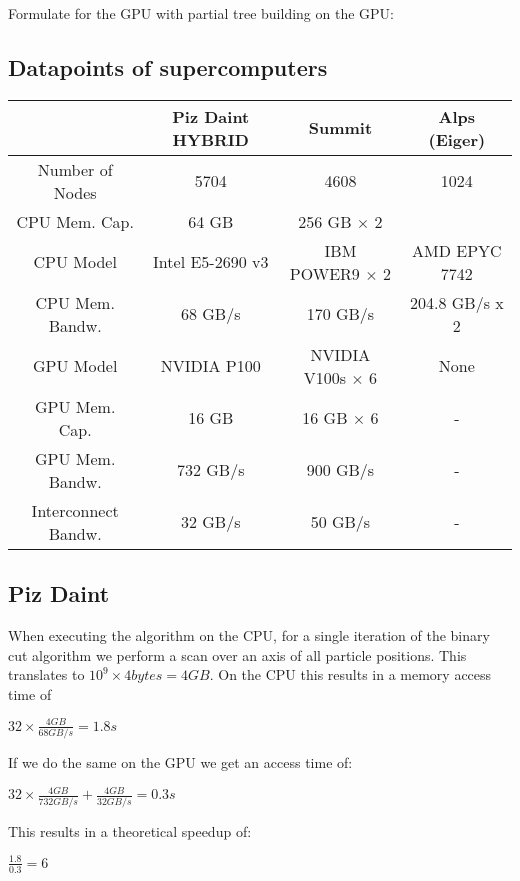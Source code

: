 \documentclass[]{article}
\begin{document}
Formulate for the GPU with partial tree building on the GPU:

\subsection{Datapoints of supercomputers}

\small
\begin{center}
	\begin{tabular}{ c c c c }
		& Piz Daint HYBRID \cite{piz_daint} & Summit & Alps (Eiger) \\ 
		\hline
		Number of Nodes & 5704 & 4608 & 1024\\
		CPU Mem. Cap. & 64 GB & 256 GB $\times$ 2  \\   
		CPU Model & Intel E5-2690 v3 & IBM POWER9 $\times$ 2 & AMD EPYC 7742 \\
		CPU Mem. Bandw.  & 68 GB/s & 170 GB/s & 204.8 GB/s x 2	\\
		GPU Model & NVIDIA P100 & NVIDIA V100s  $\times$ 6 & None \\
		GPU Mem. Cap. & 16 GB & 16 GB $\times$ 6 & -\\
		GPU Mem. Bandw. & 732 GB/s & 900 GB/s & -\\
		Interconnect Bandw. & 32 GB/s & 50 GB/s & -\\
	\end{tabular}
\end{center}
\normalfont
\subsection{Piz Daint} 
When executing the algorithm on the CPU, for a single iteration of the binary cut algorithm we perform a scan over an axis of all particle positions. This translates to $10^9 \times 4 bytes = 4 GB$.
On the CPU this results in a memory access time of 
\begin{center}
	$32 \times \frac{ 4 GB}{68 GB/s} = 1.8 s$ 
\end{center}

If we do the same on the GPU we get an access time of:
\begin{center}
	$32 \times \frac{4 GB}{732 GB/s} + \frac{4 GB}{32 GB/s} = 0.3 s$ 
\end{center}

This results in a theoretical speedup of:

\begin{center}
	$\frac{1.8}{0.3} = 6$
\end{center}
\end{document}
